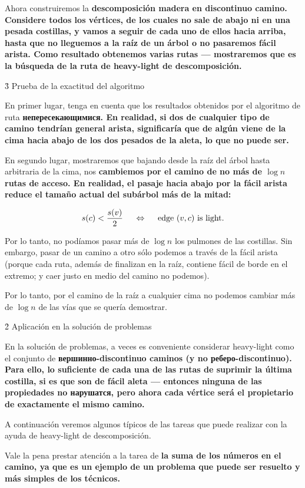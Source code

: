 Ahora construiremos la \bf{descomposición} madera en discontinuo camino. Considere todos los vértices, de los cuales no sale de abajo ni en una pesada costillas, y vamos a seguir de cada uno de ellos hacia arriba, hasta que no lleguemos a la raíz de un árbol o no pasaremos fácil arista. Como resultado obtenemos varias rutas --- mostraremos que es la búsqueda de la ruta de heavy-light de descomposición.


\h3{ Prueba de la exactitud del algoritmo }

En primer lugar, tenga en cuenta que los resultados obtenidos por el algoritmo de ruta \bf{непересекающимися}. En realidad, si dos de cualquier tipo de camino tendrían general arista, significaría que de algún viene de la cima hacia abajo de los dos pesados de la aleta, lo que no puede ser.

En segundo lugar, mostraremos que bajando desde la raíz del árbol hasta arbitraria de la cima, nos \bf{cambiemos por el camino de no más de $\log n$ rutas de acceso}. En realidad, el pasaje hacia abajo por la fácil arista reduce el tamaño actual del subárbol más de la mitad:

$$ s(c) < \frac{ s(v) }{ 2 } ~~~~ \Leftrightarrow ~~~~ {\rm edge} ~ (v,c) ~ {\rm is ~ light}. $$

Por lo tanto, no podíamos pasar más de $\log n$ los pulmones de las costillas. Sin embargo, pasar de un camino a otro sólo podemos a través de la fácil arista (porque cada ruta, además de finalizan en la raíz, contiene fácil de borde en el extremo; y caer justo en medio del camino no podemos).

Por lo tanto, por el camino de la raíz a cualquier cima no podemos cambiar más de $\log n$ de las vías que se quería demostrar.


\h2{ Aplicación en la solución de problemas }

En la solución de problemas, a veces es conveniente considerar heavy-light como el conjunto de \bf{вершинно-discontinuo} caminos (y no реберо-discontinuo). Para ello, lo suficiente de cada una de las rutas de suprimir la última costilla, si es que son de fácil aleta --- entonces ninguna de las propiedades no нарушатся, pero ahora cada vértice será el propietario de exactamente el mismo camino.

A continuación veremos algunos típicos de las tareas que puede realizar con la ayuda de heavy-light de descomposición.

Vale la pena prestar atención a la tarea de \bf{la suma de los números en el camino}, ya que es un ejemplo de un problema que puede ser resuelto y más simples de los técnicos.


